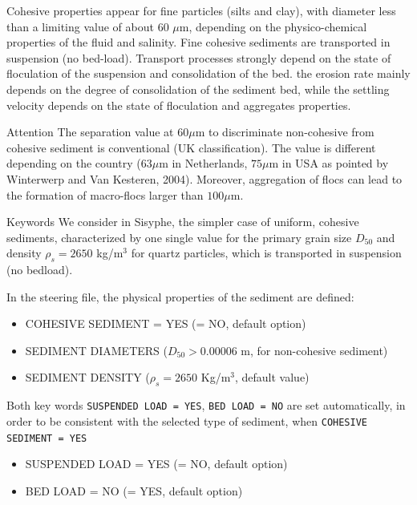 Cohesive properties 
appear for fine particles (silts and clay), with diameter less than a limiting value of about 60 $\mu$m, depending on the physico-chemical 
properties of the fluid and salinity.
Fine cohesive sediments are transported in suspension (no bed-load).
Transport processes 
strongly depend on the state of floculation of the suspension and consolidation of the bed.
the erosion rate mainly depends on the degree of consolidation of the sediment bed, 
while the settling velocity depends on the state of floculation and aggregates properties.


\begin{bclogo}[couleur = blue!10, arrondi = 0.10, logo = \bcattention]{\textsf{Attention}}
The separation value at $60\mu$m to discriminate non-cohesive from
cohesive sediment is conventional (UK classification). The value is
different depending on the country ($63\mu$m in Netherlands, $75\mu$m in USA
as pointed by Winterwerp and Van Kesteren, 2004). Moreover, aggregation of
flocs can lead to the formation of macro-flocs larger than $100\mu$m.
\end{bclogo}



\medskip
\begin{bclogo}[couleur=blue!10,arrondi=0.1, logo=\bcinfo]{Keywords}
We consider in Sisyphe, the simpler case of uniform, cohesive sediments,
characterized by one single value for the primary grain size $D_{50}$ and
density $\rho_s=2650$ kg/m$^{3}$ for quartz particles, which is
transported in suspension (no bedload).

In the \sisyphe steering file, the physical properties of the sediment are
defined:
\begin{itemize}
\item {\ttfamily COHESIVE SEDIMENT = YES} ({\ttfamily = NO}, default option)
\item {\ttfamily SEDIMENT DIAMETERS} ($D_{50} > 0.00006$ m, for non-cohesive sediment)
\item {\ttfamily SEDIMENT DENSITY} ($\rho_s = 2650$ Kg/m$^3$, default value)
\end{itemize}

Both key words \texttt{SUSPENDED LOAD = YES}, \texttt{BED LOAD = NO} are
set automatically, in order to be consistent with the selected type of
sediment, when \texttt{COHESIVE SEDIMENT = YES}

\begin{itemize}
\item {\ttfamily SUSPENDED LOAD = YES} ({\ttfamily = NO}, default option)
\item {\ttfamily BED LOAD = NO} ({\ttfamily = YES}, default option)
\end{itemize}
\end{bclogo}



